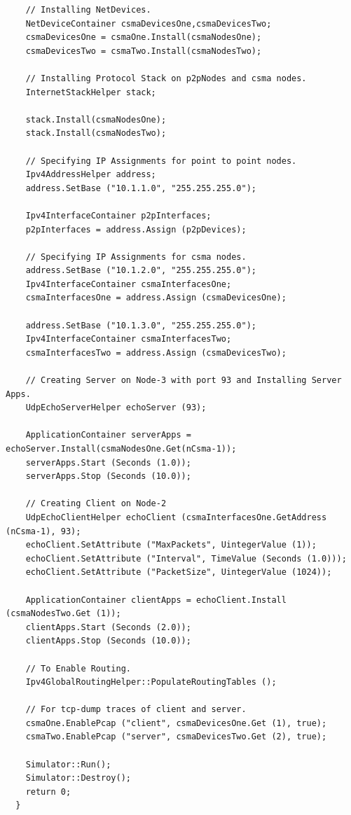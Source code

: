 \documentclass[fullpage]{article}
\begin{document}
\begin{verbatim}
    // Installing NetDevices.
    NetDeviceContainer csmaDevicesOne,csmaDevicesTwo;
    csmaDevicesOne = csmaOne.Install(csmaNodesOne);
    csmaDevicesTwo = csmaTwo.Install(csmaNodesTwo);

    // Installing Protocol Stack on p2pNodes and csma nodes.
    InternetStackHelper stack;

    stack.Install(csmaNodesOne);
    stack.Install(csmaNodesTwo);

    // Specifying IP Assignments for point to point nodes.
    Ipv4AddressHelper address;
    address.SetBase ("10.1.1.0", "255.255.255.0");

    Ipv4InterfaceContainer p2pInterfaces;
    p2pInterfaces = address.Assign (p2pDevices);

    // Specifying IP Assignments for csma nodes.
    address.SetBase ("10.1.2.0", "255.255.255.0");
    Ipv4InterfaceContainer csmaInterfacesOne;
    csmaInterfacesOne = address.Assign (csmaDevicesOne);

    address.SetBase ("10.1.3.0", "255.255.255.0");
    Ipv4InterfaceContainer csmaInterfacesTwo;
    csmaInterfacesTwo = address.Assign (csmaDevicesTwo);

    // Creating Server on Node-3 with port 93 and Installing Server Apps.
    UdpEchoServerHelper echoServer (93);

    ApplicationContainer serverApps = echoServer.Install(csmaNodesOne.Get(nCsma-1));
    serverApps.Start (Seconds (1.0));
    serverApps.Stop (Seconds (10.0));

    // Creating Client on Node-2
    UdpEchoClientHelper echoClient (csmaInterfacesOne.GetAddress (nCsma-1), 93);
    echoClient.SetAttribute ("MaxPackets", UintegerValue (1));
    echoClient.SetAttribute ("Interval", TimeValue (Seconds (1.0)));
    echoClient.SetAttribute ("PacketSize", UintegerValue (1024));

    ApplicationContainer clientApps = echoClient.Install (csmaNodesTwo.Get (1));
    clientApps.Start (Seconds (2.0));
    clientApps.Stop (Seconds (10.0));

    // To Enable Routing.
    Ipv4GlobalRoutingHelper::PopulateRoutingTables ();

    // For tcp-dump traces of client and server.
    csmaOne.EnablePcap ("client", csmaDevicesOne.Get (1), true);
    csmaTwo.EnablePcap ("server", csmaDevicesTwo.Get (2), true);

    Simulator::Run();
    Simulator::Destroy();
    return 0;
  }
\end{verbatim}
\end{document}
